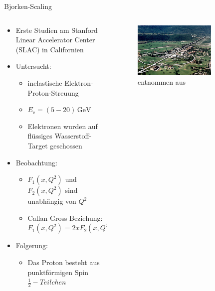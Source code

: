 \documentclass[aspectratio=1610, 9pt]{beamer}
\begin{document}
\begin{frame}{Bjorken-Scaling}
  \begin{columns}
    \begin{column}{0.4\textwidth}
      \begin{itemize}
        \item{Erste Studien am Stanford Linear Accelerator Center (SLAC) in Californien}
        \item{Untersucht:}
        \begin{itemize}
          \item {inelastische Elektron-Proton-Streuung}
          \item {$E_\text{e} = (5 - 20) \,\mathrm{GeV} $}
          \item {Elektronen wurden auf flüssiges Wasserstoff-Target geschossen}
        \end{itemize}
        \item{Beobachtung:}
        \begin{itemize}
          \item {$F_1(x, Q^2)$ und $F_2(x, Q^2)$ sind unabhängig von $Q^2$}
          \item {Callan-Gross-Beziehung: $F_1(x, Q^2) = 2x F_2(x, Q^2)$}
        \end{itemize}
        \item{Folgerung:}
        \begin{itemize}
          \item {Das Proton besteht aus punktförmigen Spin $\frac{1}{2}-Teilchen $ }
        \end{itemize}
      \end{itemize}
    \end{column}
    \begin{column}{0.6\textwidth}
      \begin{figure}
        \centering
        \includegraphics[width=0.75\textwidth]{images/ariel2.jpg}
        \caption{entnommen aus \cite{SLAC}}
      \end{figure}
    \end{column}
  \end{columns}

\end{frame}
\end{document}
